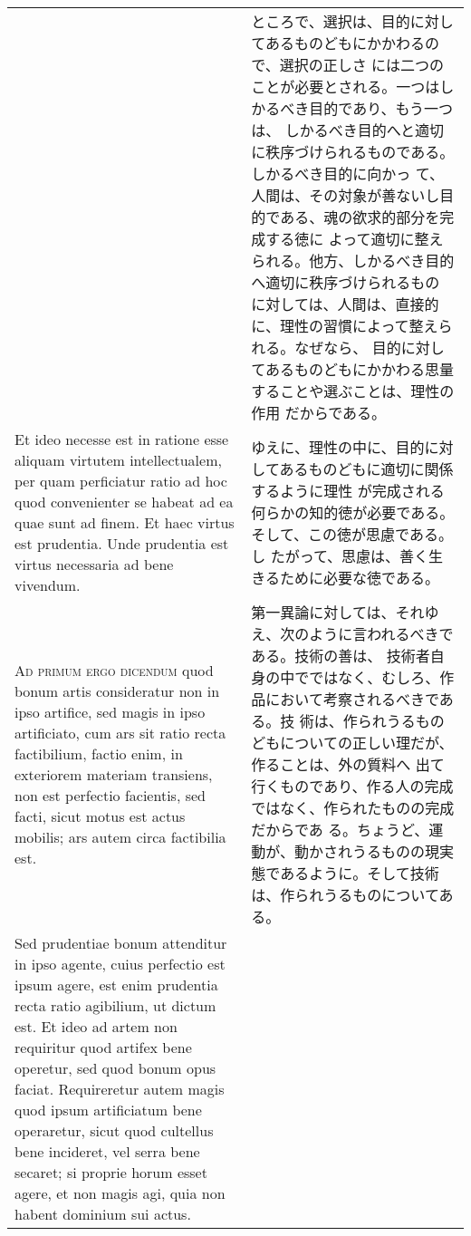 \documentclass[10pt]{jsarticle}
\begin{document}
\begin{longtable}{p{21em}p{21em}}
&

ところで、選択は、目的に対してあるものどもにかかわるので、選択の正しさ
には二つのことが必要とされる。一つはしかるべき目的であり、もう一つは、
しかるべき目的へと適切に秩序づけられるものである。しかるべき目的に向かっ
て、人間は、その対象が善ないし目的である、魂の欲求的部分を完成する徳に
よって適切に整えられる。他方、しかるべき目的へ適切に秩序づけられるもの
に対しては、人間は、直接的に、理性の習慣によって整えられる。なぜなら、
目的に対してあるものどもにかかわる思量することや選ぶことは、理性の作用
だからである。

\\

Et ideo necesse est in ratione esse aliquam virtutem intellectualem,
per quam perficiatur ratio ad hoc quod convenienter se habeat ad ea
quae sunt ad finem. Et haec virtus est prudentia. Unde prudentia est
virtus necessaria ad bene vivendum.

&

ゆえに、理性の中に、目的に対してあるものどもに適切に関係するように理性
が完成される何らかの知的徳が必要である。そして、この徳が思慮である。し
たがって、思慮は、善く生きるために必要な徳である。

\\

{\scshape Ad primum ergo dicendum} quod bonum artis consideratur non
in ipso artifice, sed magis in ipso artificiato, cum ars sit ratio
recta factibilium, factio enim, in exteriorem materiam transiens, non
est perfectio facientis, sed facti, sicut motus est actus mobilis; ars
autem circa factibilia est.

&

第一異論に対しては、それゆえ、次のように言われるべきである。技術の善は、
技術者自身の中でではなく、むしろ、作品において考察されるべきである。技
術は、作られうるものどもについての正しい理だが、作ることは、外の質料へ
出て行くものであり、作る人の完成ではなく、作られたものの完成だからであ
る。ちょうど、運動が、動かされうるものの現実態であるように。そして技術
は、作られうるものについてある。

\\

Sed prudentiae bonum attenditur in ipso agente, cuius perfectio est
ipsum agere, est enim prudentia recta ratio agibilium, ut dictum
est. Et ideo ad artem non requiritur quod artifex bene operetur, sed
quod bonum opus faciat. Requireretur autem magis quod ipsum
artificiatum bene operaretur, sicut quod cultellus bene incideret, vel
serra bene secaret; si proprie horum esset agere, et non magis agi,
quia non habent dominium sui actus.


\end{longtable}
\end{document}
